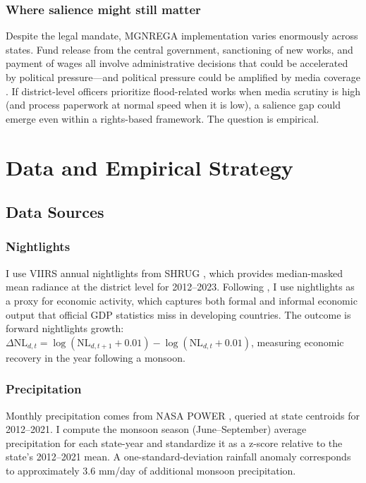 \documentclass[12pt]{article}
\begin{document}
\subsubsection*{Where salience might still matter} Despite the legal mandate, MGNREGA implementation varies enormously across states. Fund release from the central government, sanctioning of new works, and payment of wages all involve administrative decisions that could be accelerated by political pressure---and political pressure could be amplified by media coverage \citep{besley2006}. If district-level officers prioritize flood-related works when media scrutiny is high (and process paperwork at normal speed when it is low), a salience gap could emerge even within a rights-based framework. The question is empirical.


\section{Data and Empirical Strategy}

\subsection{Data Sources}

\subsubsection*{Nightlights} I use VIIRS annual nightlights from SHRUG \citep{asher2021}, which provides median-masked mean radiance at the district level for 2012--2023. Following \citet{henderson2012}, I use nightlights as a proxy for economic activity, which captures both formal and informal economic output that official GDP statistics miss in developing countries. The outcome is forward nightlights growth: $\Delta \text{NL}_{d,t} = \log(\text{NL}_{d,t+1} + 0.01) - \log(\text{NL}_{d,t} + 0.01)$, measuring economic recovery in the year following a monsoon.

\subsubsection*{Precipitation} Monthly precipitation comes from NASA POWER \citep{stackhouse2018}, queried at state centroids for 2012--2021. I compute the monsoon season (June--September) average precipitation for each state-year and standardize it as a z-score relative to the state's 2012--2021 mean. A one-standard-deviation rainfall anomaly corresponds to approximately 3.6 mm/day of additional monsoon precipitation.
\end{document}
